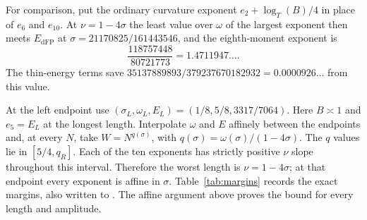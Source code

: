 \documentclass[11pt]{amsart}
\numberwithin{equation}{section}
\begin{document}
For comparison, put the ordinary curvature exponent $e_2+\log_T(B)/4$ in
place of $e_6$ and $e_{10}$. At $\nu=1-4\sigma$ the least value over
$\omega$ of the largest exponent then meets $E_{\mathrm{dFP}}$ at
$\sigma=21170825/161443546$, and the eighth-moment exponent is
\[
 \frac{118757448}{80721773}=1.4711947\ldots.
\]
The thin-energy terms save
$35137889893/379237670182932=0.0000926\ldots$ from this value.

At the left endpoint use
\((\sigma_L,\omega_L,E_L)=(1/8,5/8,3317/7064)\). Here $B\asymp1$ and $e_5=E_L$ at the longest length.
Interpolate $\omega$ and $E$ affinely between the endpoints and, at
every $N$, take \(W=N^{q(\sigma)}\), with
\(q(\sigma)=\omega(\sigma)/(1-4\sigma)\).
The $q$ values lie in \([5/4,q_R]\). Each of the ten exponents has strictly
positive $\nu$ slope throughout this interval. Therefore the worst length
is \(\nu=1-4\sigma\); at that endpoint every exponent is affine in $\sigma$.
Table~\ref{tab:margins} records the exact margins, also written to
. The affine argument above proves the
bound for every length and amplitude.
\end{document}

